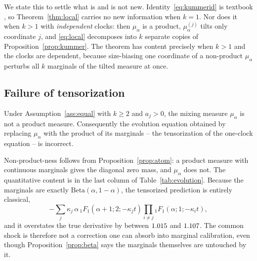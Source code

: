 \documentclass{ws-ijtaf}
\newcommand{\Bet}{\mathrm{Beta}}
\newcommand{\Fone}{{}_1F_1}
\begin{document}
We state this to settle what is and is not new. Identity~\eqref{eq:kummerid} is
textbook \citep[Eq.~13.3.15]{nist10}, so Theorem~\ref{thm:local} carries no new
information when $k=1$. Nor does it when $k>1$ with \emph{independent} clocks:
then $\mu_\alpha$ is a product, $\mu_\alpha^{(j)}$ tilts only coordinate $j$,
and \eqref{eq:local} decomposes into $k$ separate copies of
Proposition~\ref{prop:kummer}. The theorem has content precisely when $k>1$ and
the clocks are dependent, because size-biasing one coordinate of a non-product
$\mu_\alpha$ perturbs all $k$ marginals of the tilted measure at once.

\subsection{Failure of tensorization}

\begin{proposition}\label{prop:notensor}
Under Assumption~\ref{ass:equal} with $k\ge2$ and $a_j>0$, the mixing measure
$\mu_\alpha$ is not a product measure. Consequently the evolution equation
obtained by replacing $\mu_\alpha$ with the product of its marginals -- the
tensorization of the one-clock equation -- is incorrect.
\end{proposition}

Non-product-ness follows from Proposition~\ref{prop:atom}: a product measure
with continuous marginals gives the diagonal zero mass, and $\mu_\alpha$ does
not. The quantitative content is in the last column of
Table~\ref{tab:evolution}. Because the marginals are exactly
$\Bet(\alpha,1-\alpha)$, the tensorized prediction is entirely classical,
\begin{equation}
-\sum_j \kappa_j\, \alpha\, \Fone(\alpha+1;2;-\kappa_j t)
\prod_{i\ne j} \Fone(\alpha;1;-\kappa_i t),
\label{eq:tensor}
\end{equation}
and it overstates the true derivative by between
$1.015$ and $1.107$. The common shock is therefore not a
correction one can absorb into marginal calibration, even though
Proposition~\ref{prop:beta} says the marginals themselves are untouched by it.

\begin{table}[t]
{}
\label{tab:evolution}
\end{table}
\end{document}
